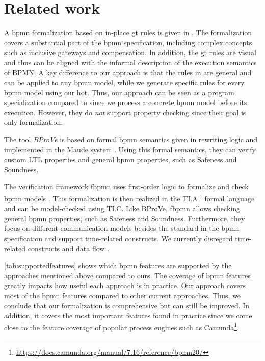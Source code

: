 \documentclass[runningheads]{llncs}
\begin{document}
\section{Related work} \label{sec:relatedWork}
A \gls*{bpmn} formalization based on in-place \gls*{gt} rules is given in \cite{vangorpVisualTokenbasedFormalization2013}.
The formalization covers a substantial part of the \gls*{bpmn} specification, including complex concepts such as inclusive gateways and compensation.
In addition, the \gls*{gt} rules are visual and thus can be aligned with the informal description of the execution semantics of BPMN.
A key difference to our approach is that the rules in \cite{vangorpVisualTokenbasedFormalization2013} are general and can be applied to any \gls*{bpmn} model, while we generate specific rules for every \gls*{bpmn} model using our \gls*{hot}.
Thus, our approach can be seen as a program specialization compared to \cite{vangorpVisualTokenbasedFormalization2013} since we process a concrete \gls*{bpmn} model before its execution.
However, they do \textit{not} support property checking since their goal is only formalization.

The tool \textit{BProVe} is based on formal \gls*{bpmn} semantics given in rewriting logic and implemented in the Maude system \cite{corradiniFormalApproachAnalysis2021}.
Using this formal semantics, they can verify custom LTL properties and general \gls*{bpmn} properties, such as Safeness and Soundness.

The verification framework \textsf{fbpmn} uses first-order logic to formalize and check \gls*{bpmn} models \cite{houhouFirstOrderLogicVerification2022}.
This formalization is then realized in the TLA\textsuperscript{+} formal language and can be model-checked using TLC.
Like BProVe, \textsf{fbpmn} allows checking general \gls*{bpmn} properties, such as Safeness and Soundness.
Furthermore, they focus on different communication models besides the standard in the \gls*{bpmn} specification and support time-related constructs.
We currently disregard time-related constructs \cite{duranVerifyingTimedBPMN2017,houhouFirstOrderLogicVerification2022} and data flow \cite{corradiniFormalisingAnimatingMultiple2022,el-saberCMMICMComplianceChecking2015}.

\autoref{tab:supportedfeatures} shows which \gls*{bpmn} features are supported by the approaches mentioned above compared to ours.
The coverage of \gls*{bpmn} features greatly impacts how useful each approach is in practice.
Our approach covers most of the \gls*{bpmn} features compared to other current approaches.
Thus, we conclude that our formalization is comprehensive but can still be improved.
In addition, it covers the most important features found in practice since we come close to the feature coverage of popular process engines such as Camunda\footnote{\url{https://docs.camunda.org/manual/7.16/reference/bpmn20/}}.
\end{document}
